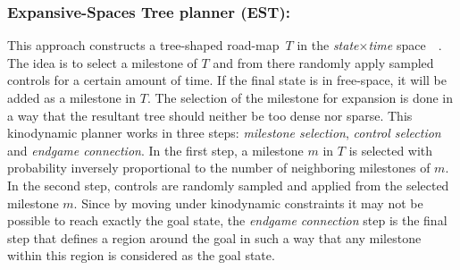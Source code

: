 \documentclass[runningheads,a4paper]{llncs}
\begin{document}
\subsubsection{Expansive-Spaces Tree planner (EST):}
This approach constructs a tree-shaped  road-map~$T$ in the \textit{state$\times$time} space~\cite{hsu1997}~\cite{hsu200}. The idea is to select a milestone
of $T$ and from there randomly apply sampled controls for a certain amount of time. If the final state is in free-space, it will be added as a
milestone in $T$. The selection of the milestone for expansion is done in a way that the resultant tree should neither be too dense nor sparse.
This kinodynamic planner works in three steps: \textit{milestone selection}, \textit{control selection} and \textit{endgame connection}.
In the first step, a milestone $m$ in $T$ is selected with probability inversely proportional to the
 number of neighboring milestones of $m$.
In the second step, controls are randomly sampled and applied from the selected milestone $m$. Since by moving under kinodynamic constraints
it may not be possible to reach exactly the goal state, the \textit{endgame connection} step is the final step that defines
a region around the goal in such a way that any milestone within this region is considered as the goal state.
\vspace{-4mm}
\end{document}
